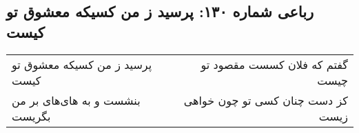 \begin{center}
\section*{رباعی شماره ۱۳۰: پرسید ز من کسیکه معشوق تو کیست}
\label{sec:sh130}
\begin{longtable}{l p{0.5cm} r}
پرسید ز من کسیکه معشوق تو کیست
&&
گفتم که فلان کسست مقصود تو چیست
\\
بنشست و به های‌های بر من بگریست
&&
کز دست چنان کسی تو چون خواهی زیست
\\
\end{longtable}
\end{center}
